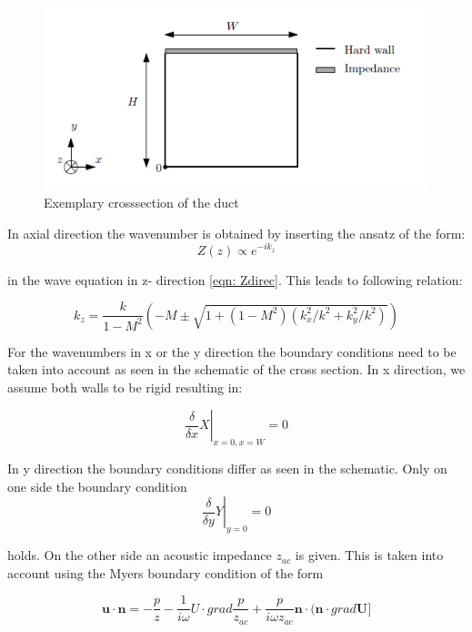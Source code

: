 \documentclass[11pt]{report} %
\begin{document}
\begin{figure}[H]
\centering
\includegraphics[scale=0.8]{./Figures/Boundary}
\caption{Exemplary crosssection of the duct}
\end{figure}

In axial direction the wavenumber is obtained by inserting the ansatz of the form: 
\begin{equation}
Z(z)\propto e^{-ik_z}
\end{equation}  

in the wave equation in z- direction \eqref{eqn: Zdirec}.
This leads to following relation:

\begin{equation}\label{eqn: Impdet2}
    k_z = \frac{k}{1-M^2} \left( -M \pm \sqrt{1+(1-M^2)(k_x^2/k^2 + k_y^2/k^2)}\right)    
\end{equation}

For the wavenumbers in x or the y direction the boundary conditions need to be taken into account as seen in the schematic of the cross section.
In x direction, we assume both walls to be rigid resulting in:
 
\begin{equation}
\left.\frac{\delta}{\delta x}X\right\rvert_{x=0,x=W}=0
\end{equation}

In y direction the boundary conditions differ as seen in the schematic. 
Only on one side the boundary condition 
\begin{equation}
\left.\frac{\delta}{\delta y}Y\right\rvert_{y=0}=0
\end{equation}

holds.
On the other side an acoustic impedance $z_{ac}$ is given. 
This is taken into account using the Myers boundary condition of the form 

\begin{equation}
\textbf{u} \cdot  \textbf{n} = - \frac{p}{z}-\frac{1}{i\omega} U \cdot grad\frac{p}{z_{ac}}+\frac{p}{i\omega z_{ac}}\textbf{n} \cdot (\textbf{n} \cdot grad\textbf{U}]
\end{equation}
\end{document}
